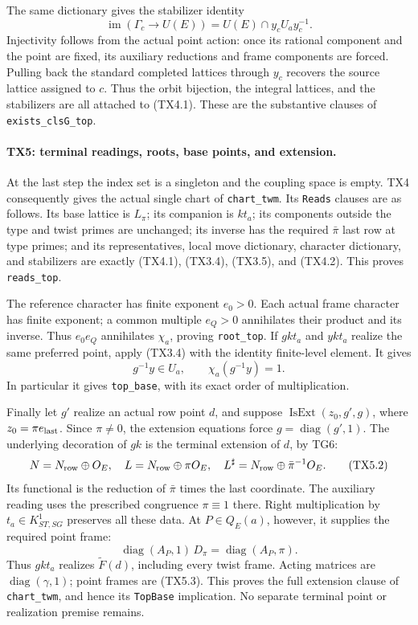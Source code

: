 The same dictionary gives the stabilizer identity
\[
 \operatorname{im}(\Gamma_c\longrightarrow U(E))
       =U(E)\cap y_cU_a y_c^{-1}.
 \tag{TX4.2}
\]
Injectivity follows from the actual point action: once its rational
component and the point are fixed, its auxiliary reductions and frame
components are forced. Pulling back the standard completed lattices
through \(y_c\) recovers the source lattice assigned to \(c\).
Thus the orbit bijection, the integral lattices, and the stabilizers
are all attached to (TX4.1). These are the substantive clauses of
\texttt{exists\_clsG\_top}.

\paragraph{TX5: terminal readings, roots, base points, and extension.}
At the last step the index set is a singleton and the coupling space
is empty. TX4 consequently gives the actual single chart of
\texttt{chart\_twm}. Its \texttt{Reads} clauses are as follows.
Its base lattice is \(L_\pi\); its companion is \(kt_a\); its
components outside the type and twist primes are unchanged; its
inverse has the required \(\bar\pi\) last row at type primes; and
its representatives, local move dictionary, character dictionary,
and stabilizers are exactly (TX4.1), (TX3.4), (TX3.5), and (TX4.2).
This proves \texttt{reads\_top}.

The reference character has finite exponent \(e_0>0\). Each actual
frame character has finite exponent; a common multiple \(e_Q>0\)
annihilates their product and its inverse. Thus \(e_0e_Q\)
annihilates \(\chi_a\), proving \texttt{root\_top}.
If \(gkt_a\) and \(ykt_a\) realize the same preferred point,
apply (TX3.4) with the identity finite-level element. It gives
\[
 g^{-1}y\in U_a,\qquad \chi_a(g^{-1}y)=1.
 \tag{TX5.1}
\]
In particular it gives \texttt{top\_base}, with its exact order
of multiplication.

Finally let \(g'\) realize an actual row point \(d\), and suppose
\(\operatorname{IsExt}(z_0,g',g)\), where
\(z_0=\pi e_{\rm last}\). Since \(\pi\ne0\), the extension
equations force \(g=\operatorname{diag}(g',1)\). The underlying
decoration of \(gk\) is the terminal extension of \(d\), by TG6:
\[
 N=N_{\rm row}\oplus O_E,\quad
 L=N_{\rm row}\oplus\pi O_E,\quad
 L^\sharp=N_{\rm row}\oplus\bar\pi^{-1}O_E.
 \tag{TX5.2}
\]
Its functional is the reduction of \(\bar\pi\) times the last
coordinate. The auxiliary reading uses the prescribed congruence
\(\pi\equiv1\) there. Right multiplication by \(t_a\in K^1_{ST,SG}\)
preserves all these data. At \(P\in Q_E(a)\), however, it supplies
the required point frame:
\[
 \operatorname{diag}(A_P,1)\,D_\pi
       =\operatorname{diag}(A_P,\pi).
 \tag{TX5.3}
\]
Thus \(gkt_a\) realizes \(\widetilde F(d)\), including every twist
frame. Acting matrices are \(\operatorname{diag}(\gamma,1)\);
point frames are (TX5.3). This proves the full extension clause
of \texttt{chart\_twm}, and hence its \texttt{TopBase} implication.
No separate terminal point or realization premise remains.

